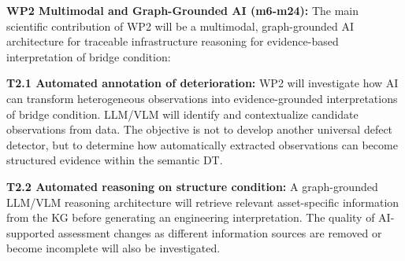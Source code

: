 \documentclass[12pt,a4paper]{article}
\begin{document}
%
\textbf{WP2 Multimodal and Graph-Grounded AI (m6-m24):} The main scientific contribution of WP2 will be a multimodal, graph-grounded AI architecture for traceable infrastructure reasoning for evidence-based interpretation of bridge condition:\par \vspace{-0.3cm}
%
\textbf{T2.1 Automated annotation of deterioration:} WP2 will investigate how AI can transform heterogeneous observations into evidence-grounded interpretations of bridge condition. LLM/VLM will identify and contextualize candidate observations from data. The objective is not to develop another universal defect detector, but to determine how automatically extracted observations can become structured evidence within the semantic DT.\par \vspace{-0.3cm}
\textbf{T2.2 Automated reasoning on structure condition:} A graph-grounded LLM/VLM reasoning architecture will retrieve relevant asset-specific information from the KG before generating an engineering interpretation. The quality of AI-supported assessment changes as different information sources are removed or become incomplete will also be investigated. %
\end{document}
